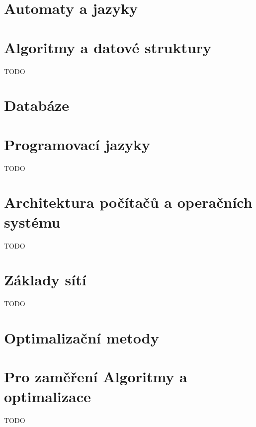 


\section{Automaty a jazyky}


\section{Algoritmy a datové struktury}
TODO

\section{Databáze}


\section{Programovací jazyky}
TODO

\section{Architektura počítačů a operačních systému}
TODO

\section{Základy sítí}
TODO

\section{Optimalizační metody}


\section{Pro zaměření Algoritmy a optimalizace}
TODO


